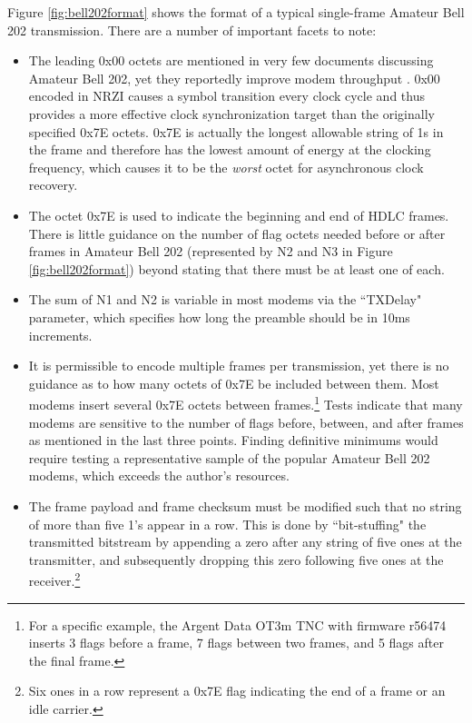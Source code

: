 \documentclass[12pt,letterpaper]{article}
\begin{document}
Figure \ref{fig:bell202format} shows the format of a typical single-frame
Amateur Bell 202 transmission. There are a number of important facets to note:
\begin{itemize}
	\item The leading 0x00 octets are mentioned in very few documents
		discussing Amateur Bell 202, yet they reportedly improve modem
		throughput \cite{millerinterview}\cite{aprsunveiled}. 
		0x00 encoded in NRZI causes a symbol transition
		every clock cycle and thus provides a more effective clock 
		synchronization target than the originally specified 0x7E octets. 
		0x7E is actually 
		the longest allowable string of 1s in the frame and 
		therefore has the lowest amount of energy at the clocking frequency,
		which causes it to be the \emph{worst} 
		octet for asynchronous clock recovery.
	\item The octet 0x7E is used to indicate the beginning and end of 
		HDLC frames.
		There is little guidance on the number of flag octets needed before
		or after frames in Amateur Bell 202 (represented by N2 and N3 in 
		Figure \ref{fig:bell202format})
		beyond stating that there must be at least one of each. 
	\item The sum of
		N1 and N2 is variable in most modems via the ``TXDelay" parameter,
		which specifies how long the preamble should be in 10ms increments.
	\item It is permissible to encode multiple 
		frames per transmission, yet there is no guidance as to how
		many octets of 0x7E be included between them.
		Most modems insert several 0x7E octets between 
		frames.\footnote{For a specific example, the Argent Data OT3m TNC 
			with firmware r56474 inserts 3 flags before
		a frame, 7 flags between two frames, and 5 flags after the final frame.}
		Tests indicate that many modems are sensitive to the number of flags 
		before, between, and after frames as mentioned in the last three points.
		Finding definitive minimums would require testing a representative
		sample of the
		popular Amateur Bell 202 modems, which exceeds the author's resources.
	\item The frame payload and frame checksum must be modified such 
		that no string of more than five 1's appear in a row.
		This is done by ``bit-stuffing" the transmitted bitstream by
		appending a zero after any string of five ones at the transmitter,
		and subsequently dropping this zero following five ones at the 
		receiver.\footnote{Six ones in a row represent a 0x7E flag indicating 
			the end of a frame or an idle carrier.
}
\end{itemize}
\end{document}
